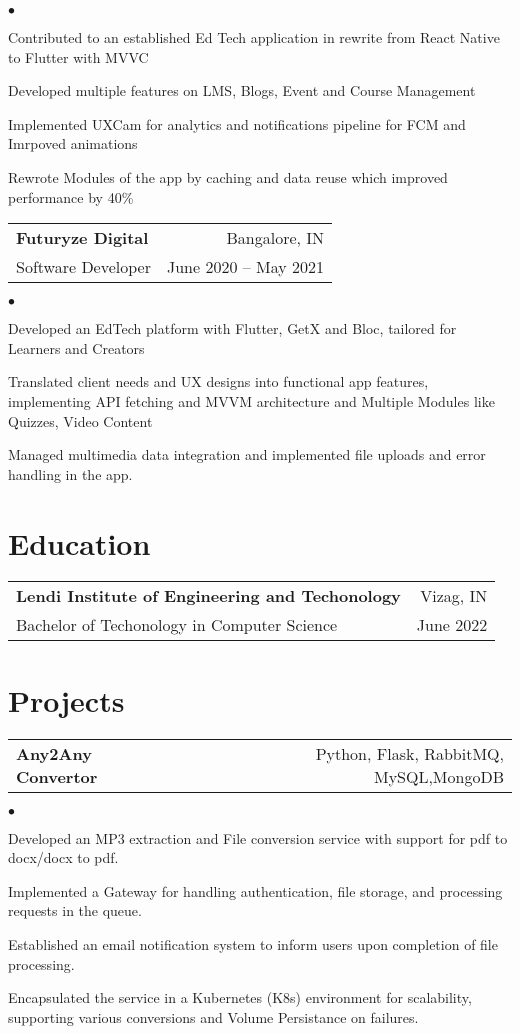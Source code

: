 \documentclass[margin, 11pt]{res}
\makeatletter
\newcommand{\resumeSubheading}[4]{

\begin{tabular*}{1.01\textwidth}{@{\hspace{-4pt}}l @{\extracolsep{\fill}} r}
\textbf{#1} & #2 \\
      {#3} &  {#4}
\end{tabular*}\vspace{-2pt}
}
\newcommand{\resumeSubSubheading}[2]{
\begin{tabular*}{1.01\textwidth}{@{\hspace{-4pt}}l @{\extracolsep{\fill}} r}
    #1 & #2 
\end{tabular*}\vspace{-7pt}
}
\newenvironment{list2}{
	\begin{list}{$\bullet$}{%
	    \small
		\setlength{\itemsep}{0in}
		\setlength{\parsep}{0in} \setlength{\parskip}{0in}
		\setlength{\topsep}{0in} \setlength{\partopsep}{0in}
		\setlength{\leftmargin}{0.2in}}}{\end{list}}
\makeatother
\begin{document}
\begin{resume}
\begin{list2}
\item{Contributed to an established Ed Tech application in rewrite from React Native to Flutter with MVVC}
\item{Developed multiple features on LMS, Blogs, Event and Course Management}
\item{Implemented UXCam for analytics and notifications pipeline for FCM and Imrpoved animations}
\item{Rewrote Modules of the app by caching and data reuse which improved performance by 40\%}
\end{list2}

\resumeSubheading{{\bf Futuryze Digital}}{Bangalore, IN}
                 {Software Developer}{June 2020 -- May 2021}

\begin{list2}
\item{Developed an EdTech platform with Flutter, GetX and Bloc, tailored for Learners and Creators }
\item{Translated client needs and UX designs into functional app features, implementing API fetching and MVVM architecture and Multiple Modules like Quizzes, Video Content }
\item{Managed multimedia data integration and implemented file uploads and error handling in the app. }
\end{list2}


\section{\sc Education}

\vspace{2pt}

\resumeSubheading{Lendi Institute of Engineering and Techonology}{Vizag, IN}
             {Bachelor of Techonology in Computer Science}{June 2022}

\section{\sc Projects}

\resumeSubSubheading{\textbf{Any2Any Convertor}}
{Python, Flask, RabbitMQ, MySQL,MongoDB}

\begin{list2}
\item {Developed an MP3 extraction and File conversion service with support for pdf to docx/docx to pdf.}
        \item {Implemented a Gateway for handling authentication, file storage, and processing requests in the queue.}
        \item {Established an email notification system to inform users upon completion of file processing.}
        \item {Encapsulated the service in a Kubernetes (K8s) environment for scalability, supporting various conversions and Volume Persistance on failures.}
\end{list2}


\end{resume}
\end{document}
